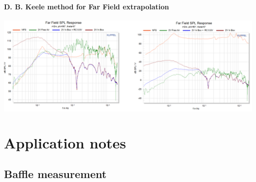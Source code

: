 \documentclass{report}
\begin{document}
\begin{appendices}
\subsubsection{D. B. Keele method for Far Field extrapolation}
\label{Curves:dbkFF}

\begin{center}
	\includegraphics[width=\textwidth]{Appendix/DKeele_FF_All} 
    \captionsetup{hypcap=false} 
	\label{fig:dbk_fig}
\end{center}




\chapter{Application notes}

\section{Baffle measurement}
\label{chap:AN_Baffle}

\end{appendices}
\end{document}
